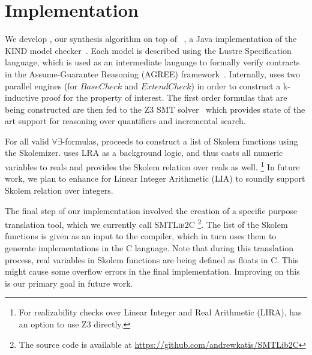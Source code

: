 \section{Implementation}
\label{sec:impl}

We develop \jkindsynt, our synthesis algorithm on top of \jkind~\cite{jkind},
a Java implementation of the \textsc{KIND} model
checker~\cite{Hagen08:kind}. Each model is described using the Lustre
Specification language, which is used as an intermediate language to formally verify contracts in the
Assume-Guarantee Reasoning (\textsc{AGREE}) framework~\cite{NFM2012:CoGaMiWhLaLu}.
Internally, \jkind uses two parallel engines (for $\mathit{BaseCheck}$ and
$\mathit{ExtendCheck}$) in order to construct a k-inductive proof for the
property of interest.
The first order formulas that are being constructed are then fed to the \textsc{Z3} SMT
solver~\cite{DeMoura08:z3} which provides state of the art support for reasoning
over quantifiers and incremental search.

For all valid $\forall\exists$-formulas, \jkindsynt proceeds to construct a list of
Skolem functions using the \aeval Skolemizer.
\aeval uses LRA as a background logic, and thus casts all numeric variables to reals and provides the Skolem relation over reals as well.%
\footnote{For realizability checks over Linear Integer and Real
  Arithmetic (LIRA), \jkind has an option to use \textsc{Z3} directly.}
In future work, we plan to enhance \aeval for Linear Integer Arithmetic (LIA) to soundly support Skolem relation over integers.

The final step of our implementation involved the creation of a specific purpose
translation tool, which we currently call \textsc{SMTLib2C}%
\footnote{The source code
is available at \url{https://github.com/andrewkatis/SMTLib2C}}. The list
of the Skolem functions is given as an input to the compiler, which in turn uses
them to generate implementations in the C language. 
Note that during this translation process, real
variables in Skolem functions are being defined as floats in C. This might cause some
overflow errors in the final implementation. 
Improving on this is our primary goal in future work.




